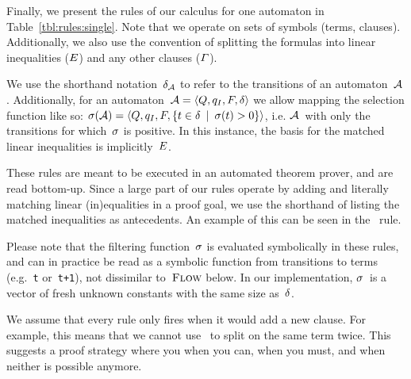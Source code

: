 \documentclass[acmsmall,review,anonymous,screen]{acmart}\settopmatter{printfolios=true,printccs=false,printacmref=true}
\theoremstyle{definition}
\begin{document}
Finally, we present the rules of our calculus for one automaton in Table~\ref{tbl:rules:single}. Note that we
operate on sets of symbols (terms, clauses). Additionally, we also use the
convention of splitting the formulas into linear inequalities ($E$)
and any other clauses ($\varGamma$).

We use the shorthand notation~$\delta_{\mathcal{A}}$ to refer to the
transitions of an automaton~$\mathcal{A}$. Additionally, for an
automaton~$\mathcal{A} = \left\langle Q, q_I, F, \delta\right\rangle$ we allow mapping the selection function
like so: $\operatorname{\sigma}(\mathcal{A}) = \left\langle Q, q_I, F,
\left\{t \in \delta \:\mid\: \operatorname{\sigma}(t) > 0\right\}\right\rangle$, i.e.
$\mathcal{A}$~with only the transitions for which~$\operatorname{\sigma}$ is positive. In this
instance, the basis for the matched linear inequalities is
implicitly~$E$.

These rules are meant to be executed in an automated theorem prover, and are
read bottom-up. Since a large part of our rules operate by adding and literally
matching linear (in)equalities in a proof goal, we use the shorthand of listing
the matched inequalities as antecedents. An example of this can be seen in
the~\Propagate{} rule.

Please note that the filtering function~$\operatorname{\sigma}$ is evaluated symbolically in
these rules, and can in practice be read as a symbolic function from transitions
to terms (e.g.~\texttt{t} or~\texttt{t+1}), not dissimilar to~$\textsc{Flow}$ below.
In our implementation, $\operatorname{\sigma}$~is a vector of fresh unknown constants with the
same size as~$\delta$.

We assume that every rule only fires when it would add a new clause. For
example, this means that we cannot use~\Split{} to split on the same term twice.
This suggests a proof strategy where you \Propagate{} when you can, \Split{}
when you must, and \Subsume{} when neither is possible anymore.
\end{document}
